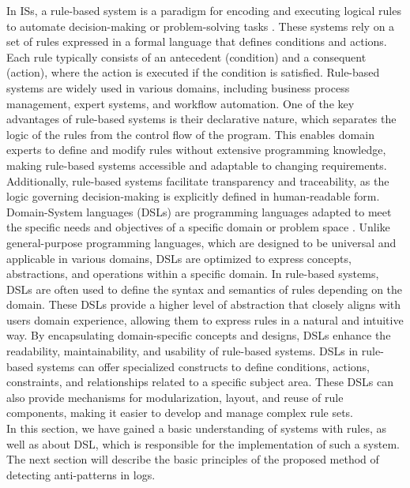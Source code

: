 \documentclass[12pt, times]{article}
\begin{document}
	\hspace*{5mm}In ISs, a rule-based system is a paradigm for encoding and executing logical rules to automate decision-making or problem-solving tasks \cite{rule}. These systems rely on a set of rules expressed in a formal language that defines conditions and actions. Each rule typically consists of an antecedent (condition) and a consequent (action), where the action is executed if the condition is satisfied. Rule-based systems are widely used in various domains, including business process management, expert systems, and workflow automation.\newline
	\hspace*{5mm}One of the key advantages of rule-based systems is their declarative nature, which separates the logic of the rules from the control flow of the program. This enables domain experts to define and modify rules without extensive programming knowledge, making rule-based systems accessible and adaptable to changing requirements. Additionally, rule-based systems facilitate transparency and traceability, as the logic governing decision-making is explicitly defined in human-readable form.\newline
	\hspace*{5mm}Domain-System languages (DSLs) are programming languages adapted to meet the specific needs and objectives of a specific domain or problem space \cite{dsl}. Unlike general-purpose programming languages, which are designed to be universal and applicable in various domains, DSLs are optimized to express concepts, abstractions, and operations within a specific domain.\newline
	\hspace*{5mm}In rule-based systems, DSLs are often used to define the syntax and semantics of rules depending on the domain. These DSLs provide a higher level of abstraction that closely aligns with users domain experience, allowing them to express rules in a natural and intuitive way. By encapsulating domain-specific concepts and designs, DSLs enhance the readability, maintainability, and usability of rule-based systems. DSLs in rule-based systems can offer specialized constructs to define conditions, actions, constraints, and relationships related to a specific subject area. These DSLs can also provide mechanisms for modularization, layout, and reuse of rule components, making it easier to develop and manage complex rule sets. \\
	\hspace*{5mm}In this section, we have gained a basic understanding of systems with rules, as well as about DSL, which is responsible for the implementation of such a system. The next section will describe the basic principles of the proposed method of detecting anti-patterns in logs.
	
\end{document}
